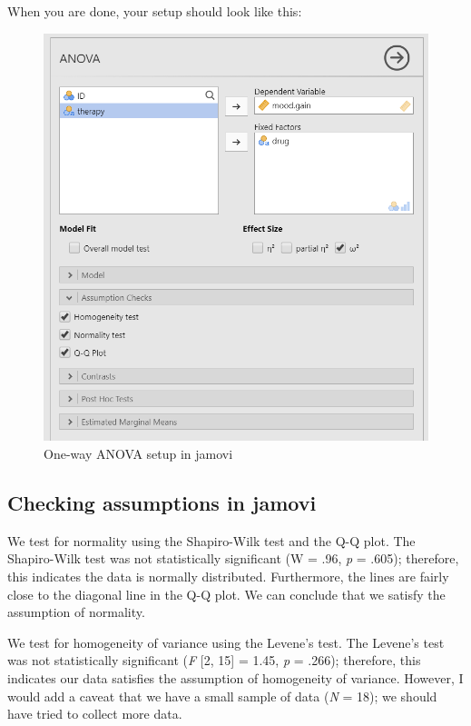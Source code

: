\documentclass[
]{book}
\begin{document}
When you are done, your setup should look like this:

\begin{figure}

{\centering \includegraphics[width=0.8\linewidth]{images/04_one-way-anova/one-way_setup} 

}

\caption{One-way ANOVA setup in jamovi}\label{fig:unnamed-chunk-2}
\end{figure}

\hypertarget{checking-assumptions-in-jamovi-2}{%
\subsection{Checking assumptions in jamovi}\label{checking-assumptions-in-jamovi-2}}

We test for normality using the Shapiro-Wilk test and the Q-Q plot. The Shapiro-Wilk test was not statistically significant (W = .96, \emph{p} = .605); therefore, this indicates the data is normally distributed. Furthermore, the lines are fairly close to the diagonal line in the Q-Q plot. We can conclude that we satisfy the assumption of normality.

We test for homogeneity of variance using the Levene's test. The Levene's test was not statistically significant (\emph{F} {[}2, 15{]} = 1.45, \emph{p} = .266); therefore, this indicates our data satisfies the assumption of homogeneity of variance. However, I would add a caveat that we have a small sample of data (\emph{N} = 18); we should have tried to collect more data.
\end{document}
